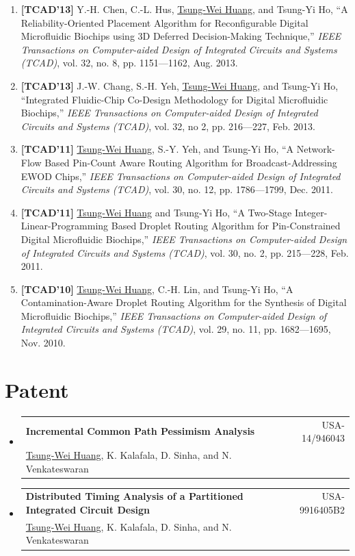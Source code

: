 \documentclass[A4,11pt]{article}
\makeatletter
\newcommand{\CVSubheading}[4]{
  \vspace{-2pt}\item
    \begin{tabular*}{0.97\textwidth}[t]{l@{\extracolsep{\fill}}r}
      \textbf{#1} & #2 \\
      \small#3 & \small #4 \\
    \end{tabular*}\vspace{-7pt}
}
\newcommand{\CVSubHeadingListStart}{\begin{itemize}[leftmargin=0.5cm, label={}]}
\newcommand{\CVSubHeadingListEnd}{\end{itemize}}
\makeatother
\begin{document}
\begin{enumerate}
  \item \textbf{[TCAD'13]} Y.-H. Chen, C.-L. Hus, \underline{Tsung-Wei Huang}, and Tsung-Yi Ho, ``A Reliability-Oriented Placement Algorithm for Reconfigurable Digital Microfluidic Biochips using 3D Deferred Decision-Making Technique,'' \textit{IEEE Transactions on Computer-aided Design of Integrated Circuits and Systems (TCAD)}, vol. 32, no. 8, pp. 1151—1162, Aug. 2013.

  \item \textbf{[TCAD'13]} J.-W. Chang, S.-H. Yeh, \underline{Tsung-Wei Huang}, and Tsung-Yi Ho, ``Integrated Fluidic-Chip Co-Design Methodology for Digital Microfluidic Biochips,'' \textit{IEEE Transactions on Computer-aided Design of Integrated Circuits and Systems (TCAD)}, vol. 32, no 2, pp. 216—227, Feb. 2013.

  \item \textbf{[TCAD'11]} \underline{Tsung-Wei Huang}, S.-Y. Yeh, and Tsung-Yi Ho, ``A Network-Flow Based Pin-Count Aware Routing Algorithm for Broadcast-Addressing EWOD Chips,'' \textit{IEEE Transactions on Computer-aided Design of Integrated Circuits and Systems (TCAD)}, vol. 30, no. 12, pp. 1786—1799, Dec. 2011.

  \item \textbf{[TCAD'11]} \underline{Tsung-Wei Huang} and Tsung-Yi Ho, ``A Two-Stage Integer-Linear-Programming Based Droplet Routing Algorithm for Pin-Constrained Digital Microfluidic Biochips,'' \textit{IEEE Transactions on Computer-aided Design of Integrated Circuits and Systems (TCAD)}, vol. 30, no. 2, pp. 215—228, Feb. 2011. 

  \item \textbf{[TCAD'10]} \underline{Tsung-Wei Huang}, C.-H. Lin, and Tsung-Yi Ho, ``A Contamination-Aware Droplet Routing Algorithm for the Synthesis of Digital Microfluidic Biochips,'' \textit{IEEE Transactions on Computer-aided Design of Integrated Circuits and Systems (TCAD)}, vol. 29, no. 11, pp. 1682—1695, Nov. 2010. 

 \end{enumerate}

\section{Patent}
  \CVSubHeadingListStart
    \CVSubheading %
     {Incremental Common Path Pessimism Analysis}{USA-14/946043}
     {\underline{Tsung-Wei Huang}, K. Kalafala, D. Sinha, and N. Venkateswaran}{}
    \CVSubheading %
     {Distributed Timing Analysis of a Partitioned Integrated Circuit Design}{USA-9916405B2}
     {\underline{Tsung-Wei Huang}, K. Kalafala, D. Sinha, and N. Venkateswaran}{}
  \CVSubHeadingListEnd  
\end{document}
